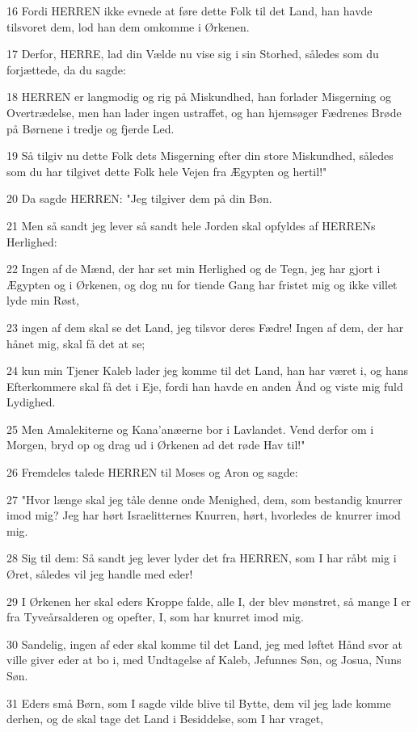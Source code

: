 \par 16 Fordi HERREN ikke evnede at føre dette Folk til det Land, han havde tilsvoret dem, lod han dem omkomme i Ørkenen.
\par 17 Derfor, HERRE, lad din Vælde nu vise sig i sin Storhed, således som du forjættede, da du sagde:
\par 18 HERREN er langmodig og rig på Miskundhed, han forlader Misgerning og Overtrædelse, men han lader ingen ustraffet, og han hjemsøger Fædrenes Brøde på Børnene i tredje og fjerde Led.
\par 19 Så tilgiv nu dette Folk dets Misgerning efter din store Miskundhed, således som du har tilgivet dette Folk hele Vejen fra Ægypten og hertil!"
\par 20 Da sagde HERREN: "Jeg tilgiver dem på din Bøn.
\par 21 Men så sandt jeg lever så sandt hele Jorden skal opfyldes af HERRENs Herlighed:
\par 22 Ingen af de Mænd, der har set min Herlighed og de Tegn, jeg har gjort i Ægypten og i Ørkenen, og dog nu for tiende Gang har fristet mig og ikke villet lyde min Røst,
\par 23 ingen af dem skal se det Land, jeg tilsvor deres Fædre! Ingen af dem, der har hånet mig, skal få det at se;
\par 24 kun min Tjener Kaleb lader jeg komme til det Land, han har været i, og hans Efterkommere skal få det i Eje, fordi han havde en anden Ånd og viste mig fuld Lydighed.
\par 25 Men Amalekiterne og Kana'anæerne bor i Lavlandet. Vend derfor om i Morgen, bryd op og drag ud i Ørkenen ad det røde Hav til!"
\par 26 Fremdeles talede HERREN til Moses og Aron og sagde:
\par 27 "Hvor længe skal jeg tåle denne onde Menighed, dem, som bestandig knurrer imod mig? Jeg har hørt Israelitternes Knurren, hørt, hvorledes de knurrer imod mig.
\par 28 Sig til dem: Så sandt jeg lever lyder det fra HERREN, som I har råbt mig i Øret, således vil jeg handle med eder!
\par 29 I Ørkenen her skal eders Kroppe falde, alle I, der blev mønstret, så mange I er fra Tyveårsalderen og opefter, I, som har knurret imod mig.
\par 30 Sandelig, ingen af eder skal komme til det Land, jeg med løftet Hånd svor at ville giver eder at bo i, med Undtagelse af Kaleb, Jefunnes Søn, og Josua, Nuns Søn.
\par 31 Eders små Børn, som I sagde vilde blive til Bytte, dem vil jeg lade komme derhen, og de skal tage det Land i Besiddelse, som I har vraget,
